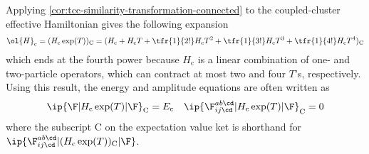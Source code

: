 \begin{cor}
\label{cor:tcc-similarity-transformation-connected}
\end{cor}


\begin{rmk}\label{rmk:connected-expansion}
Applying \cref{cor:tcc-similarity-transformation-connected} to the coupled-cluster effective Hamiltonian gives the following expansion
\begin{align}
  \ol{H}_{\text{c}}
=
  (H_{\text{c}}\,
   \text{exp}(T))_{\text{C}}
=
  (
    H_{\text{c}}
  +
    H_{\text{c}}
    T
  +
    \tfr{1}{2!}
    H_{\text{c}}
    T^2
  +
    \tfr{1}{3!}
    H_{\text{c}}
    T^3
  +
    \tfr{1}{4!}
    H_{\text{c}}
    T^4
  )_{\text{C}}
\end{align}
which ends at the fourth power because $H_{\text{c}}$ is a linear combination of one- and two-particle operators, which can contract at most two and four $T$'s, respectively.
Using this result, the energy and amplitude equations are often written as
\begin{align}
\label{eq:traditional-cc-equations-2}
  \ip{\F|H_{\text{c}}\,\text{exp}(T)|\F}_{\text{C}}
=
  E_{\text{c}}
&&
  \ip{\F_{ij\cd}^{ab\cd}|H_{\text{c}}\,\text{exp}(T)|\F}_{\text{C}}
=
  0
\end{align}
where the subscript $\text{C}$ on the expectation value ket is shorthand for
$
  \ip{\F_{ij\cd}^{ab\cd}|(H_{\text{c}}\,\text{exp}(T))_{\text{C}}|\F}
$.
\end{rmk}


